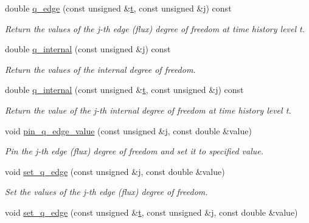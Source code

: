 \begin{DoxyCompactItemize}
double \hyperlink{classoomph_1_1TAxisymmetricPoroelasticityElement_aecff7a5e70e3567800d142f0fb24660e}{q\+\_\+edge} (const unsigned \&\hyperlink{cfortran_8h_af6f0bd3dc13317f895c91323c25c2b8f}{t}, const unsigned \&j) const
\begin{DoxyCompactList}\small\item\em Return the values of the j-\/th edge (flux) degree of freedom at time history level t. \end{DoxyCompactList}\item 
double \hyperlink{classoomph_1_1TAxisymmetricPoroelasticityElement_af21c0187d947dc5a59278a3dd5b2397f}{q\+\_\+internal} (const unsigned \&j) const
\begin{DoxyCompactList}\small\item\em Return the values of the internal degree of freedom. \end{DoxyCompactList}\item 
double \hyperlink{classoomph_1_1TAxisymmetricPoroelasticityElement_a0fd7afe9fbe587b86fd77317194180b9}{q\+\_\+internal} (const unsigned \&\hyperlink{cfortran_8h_af6f0bd3dc13317f895c91323c25c2b8f}{t}, const unsigned \&j) const
\begin{DoxyCompactList}\small\item\em Return the value of the j-\/th internal degree of freedom at time history level t. \end{DoxyCompactList}\item 
void \hyperlink{classoomph_1_1TAxisymmetricPoroelasticityElement_ab70396f50ef5db1cc9162637a72ae8c2}{pin\+\_\+q\+\_\+edge\+\_\+value} (const unsigned \&j, const double \&value)
\begin{DoxyCompactList}\small\item\em Pin the j-\/th edge (flux) degree of freedom and set it to specified value. \end{DoxyCompactList}\item 
void \hyperlink{classoomph_1_1TAxisymmetricPoroelasticityElement_aadc0873c12a2d059f49b4a2d85ec054b}{set\+\_\+q\+\_\+edge} (const unsigned \&j, const double \&value)
\begin{DoxyCompactList}\small\item\em Set the values of the j-\/th edge (flux) degree of freedom. \end{DoxyCompactList}\item 
void \hyperlink{classoomph_1_1TAxisymmetricPoroelasticityElement_aa6aa64af2580183c4e81a1466c6e467f}{set\+\_\+q\+\_\+edge} (const unsigned \&\hyperlink{cfortran_8h_af6f0bd3dc13317f895c91323c25c2b8f}{t}, const unsigned \&j, const double \&value)

\end{DoxyCompactItemize}
